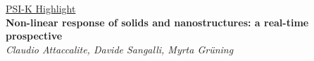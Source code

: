 \documentclass[preprint,showpacs,prb,superscriptaddress,aps,floatfix]{revtex4-1}
\renewcommand{\baselinestretch}{1.2}
\newcommand{\clearemptydoublepage}{\newpage{\pagestyle{empty}\cleardoublepage}}
\renewcommand{\[}{\left[}
\renewcommand{\]}{\right]}
\renewcommand{\(}{\left(}
\renewcommand{\)}{\right)}
\renewcommand{\[}{\left[}
\renewcommand{\]}{\right]}
\renewcommand{\(}{\left(}
\renewcommand{\)}{\right)}
\begin{document}
\pagestyle{empty}

\begin{center}

\begin{figure}
\hspace{2cm}
\end{figure}
\vspace{-2cm}
\Large{\underline{PSI-K Highlight}}\\
\vspace{1cm}
\LARGE{
{\bf Non-linear response of solids and nanostructures: a real-time prospective}}\\
\Large{\it Claudio Attaccalite, Davide Sangalli, Myrta Gr\"uning}\\[1cm]
\end{center}

\clearemptydoublepage


\pagestyle{plain}

\setcounter{tocdepth}{4}
\renewcommand{\baselinestretch}{1.5}
%
\clearemptydoublepage






%

%

%

%

%
\clearemptydoublepage



\end{document}
